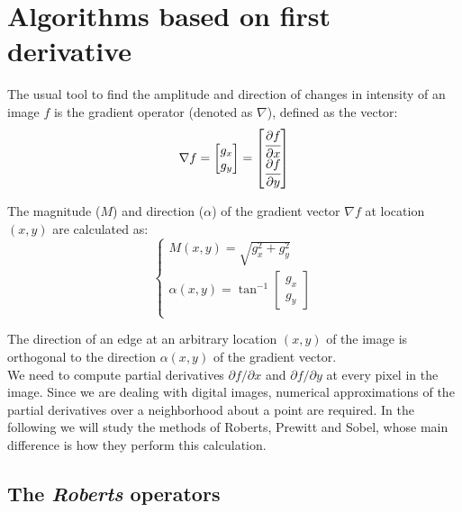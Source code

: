 \documentclass{ipol}
\numberwithin{equation}{section}
\numberwithin{table}{section}
\numberwithin{figure}{section}
\begin{document}
\section{Algorithms based on first derivative}
\label{sec:first}

The usual tool to find the amplitude and direction of changes in 
intensity of an image $f$ is the gradient operator (denoted as $\nabla$), defined 
as the vector:
\begin{equation}
	\nabla f = 
				\begin{bmatrix} 
					g_x \\ g_y
				\end{bmatrix}
	=				
				\begin{bmatrix} 
					\cfrac{\partial f}{\partial x} \\ \cfrac{\partial f}{\partial y} \\
				\end{bmatrix}
\end{equation}

The magnitude ($M$) and direction ($\alpha$) of the gradient vector $\nabla f$ at location $(x,y)$
are calculated as:
\begin{equation}
	\begin{cases}
		M(x,y) = \sqrt{g_x^2 + g_y^2} \\
		\alpha(x,y) = \tan^{-1} \begin{bmatrix} g_x \\ g_y \end{bmatrix} \\
	\end{cases}
\end{equation}

The direction of an edge at an arbitrary location $(x,y)$ of the image is 
orthogonal to the direction $\alpha(x,y)$ of the gradient vector.\\

We need to compute partial derivatives $\partial f/\partial x$ and $\partial f/\partial y$ 
at every pixel in the image. Since we are dealing with digital images, numerical approximations 
of the partial derivatives over a neighborhood about a point are required. In the following we will study 
the methods of Roberts, Prewitt and Sobel, whose main difference is how they perform this calculation.\\

\subsection{The \textit{Roberts} operators}
\end{document}
